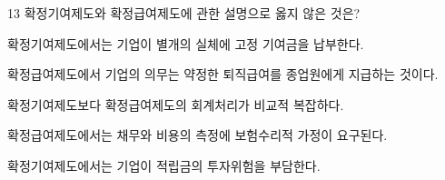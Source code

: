 \begin{question}{13}
확정기여제도와 확정급여제도에 관한 설명으로 옳지 않은 것은?
\begin{choices}
  \item 확정기여제도에서는 기업이 별개의 실체에 고정 기여금을 납부한다.
  \item 확정급여제도에서 기업의 의무는 약정한 퇴직급여를 종업원에게 지급하는 것이다.
  \item 확정기여제도보다 확정급여제도의 회계처리가 비교적 복잡하다.
  \item 확정급여제도에서는 채무와 비용의 측정에 보험수리적 가정이 요구된다.
  \item 확정기여제도에서는 기업이 적립금의 투자위험을 부담한다.
\end{choices}
\end{question}
